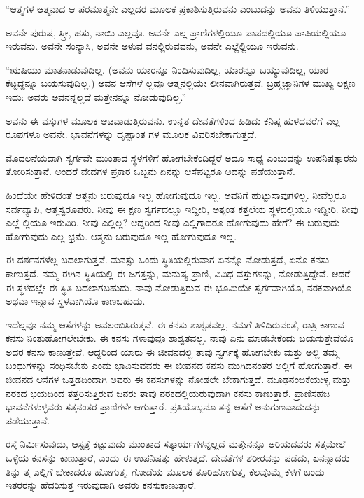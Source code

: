 “ಆತ್ಮಗಳ ಆತ್ಮನಾದ ಆ ಪರಮಾತ್ಮನೇ ಎಲ್ಲದರ ಮೂಲಕ ಪ್ರಕಾಶಿಸುತ್ತಿರುವನು ಎಂಬುದನ್ನು ಅವನು ತಿಳಿಯುತ್ತಾನೆ.”

ಅವನೇ ಪುರುಷ, ಸ್ತ್ರೀ, ಹಸು, ನಾಯಿ ಎಲ್ಲವೂ. ಅವನೇ ಎಲ್ಲ ಪ್ರಾಣಿಗಳಲ್ಲಿಯೂ ಪಾಪದಲ್ಲಿಯೂ ಪಾಪಿಯಲ್ಲಿಯೂ ಇರುವನು. ಅವನೇ ಸಂನ್ಯಾಸಿ, ಅವನೇ ಅಳುವ ವನಲ್ಲಿರುವವನು, ಅವನೇ ಎಲ್ಲೆಲ್ಲಿಯೂ ಇರುವನು.

“ಋಷಿಯು ಮಾತನಾಡುವುದಿಲ್ಲ. (ಅವನು ಯಾರನ್ನೂ ನಿಂದಿಸುವುದಿಲ್ಲ, ಯಾರನ್ನೂ ಬಯ್ಯುವುದಿಲ್ಲ, ಯಾರ ಕೆಟ್ಟದ್ದನ್ನೂ ಬಯಸುವುದಿಲ್ಲ.) ಅವನ ಆಸೆಗಳೆ ಲ್ಲವೂ ಆತ್ಮನಲ್ಲಿಯೇ ಲೀನವಾಗಿರುತ್ತವೆ. ಬ್ರಹ್ಮಜ್ಞಾನಿಗಳ ಮುಖ್ಯ ಲಕ್ಷಣ ಇದು: ಅವರು ಅವನನ್ನಲ್ಲದೆ ಮತ್ತೇನನ್ನೂ ನೋಡುವುದಿಲ್ಲ.”

ಅವನು ಈ ವಸ್ತುಗಳ ಮೂಲಕ ಆಟವಾಡುತ್ತಿರುವನು. ಉನ್ನತ ದೇವತೆಗಳಿಂದ ಹಿಡಿದು ಕನಿಷ್ಠ ಹುಳದವರೆಗೆ ಎಲ್ಲ ರೂಪಗಳೂ ಅವನೇ. ಭಾವನೆಗಳನ್ನು ದೃಷ್ಟಾಂತ ಗಳ ಮೂಲಕ ವಿವರಿಸಬೇಕಾಗುತ್ತದೆ.

ಮೊದಲನೆಯದಾಗಿ ಸ್ವರ್ಗವೇ ಮುಂತಾದ ಸ್ಥಳಗಳಿಗೆ ಹೋಗಬೇಕೆಂದಿದ್ದರೆ ಅದೂ ಸಾಧ್ಯ ಎಂಬುದನ್ನು ಉಪನಿಷತ್ಕಾರನು ತೋರಿಸುತ್ತಾನೆ. ಅಂದರೆ ವೇದಗಳ ಪ್ರಕಾರ ಒಬ್ಬನು ಏನನ್ನು ಆಸೆಪಟ್ಟರೂ ಅದನ್ನು ಪಡೆಯುತ್ತಾನೆ.

ಹಿಂದೆಯೇ ಹೇಳಿದಂತೆ ಆತ್ಮನು ಬರುವುದೂ ಇಲ್ಲ ಹೋಗುವುದೂ ಇಲ್ಲ. ಅವನಿಗೆ ಹುಟ್ಟುಸಾವುಗಳಿಲ್ಲ. ನೀವೆಲ್ಲರೂ ಸರ್ವವ್ಯಾಪಿ, ಆತ್ಮಸ್ವರೂಪರು. ನೀವು ಈ ಕ್ಷಣ ಸ್ವರ್ಗದಲ್ಲೂ ಇದ್ದೀರಿ, ಅತ್ಯಂತ ಕತ್ತಲೆಯ ಸ್ಥಳದಲ್ಲಿಯೂ ಇದ್ದೀರಿ. ನೀವು ಎಲ್ಲೆ ಲ್ಲಿಯೂ ಇರುವಿರಿ. ನೀವು ಎಲ್ಲಿಲ್ಲ? ಆದ್ದರಿಂದ ನೀವು ಎಲ್ಲಿಗಾದರೂ ಹೋಗುವುದು ಹೇಗೆ? ಈ ಬರುವುದು ಹೋಗುವುದು ಎಲ್ಲ ಭ್ರಮೆ. ಆತ್ಮನು ಬರುವುದೂ ಇಲ್ಲ ಹೋಗುವುದೂ ಇಲ್ಲ.

ಈ ದರ್ಶನಗಳೆಲ್ಲ ಬದಲಾಗುತ್ತವೆ. ಮನಸ್ಸು ಒಂದು ಸ್ಥಿತಿಯಲ್ಲಿರುವಾಗ ಏನನ್ನೊ ನೋಡುತ್ತದೆ, ಏನೊ ಕನಸು ಕಾಣುತ್ತದೆ. ನಮ್ಮ ಈಗಿನ ಸ್ಥಿತಿಯಲ್ಲಿ ಈ ಜಗತ್ತನ್ನು, ಮನುಷ್ಯ ಪ್ರಾಣಿ, ವಿವಿಧ ವಸ್ತುಗಳನ್ನು, ನೋಡುತ್ತಿದ್ದೇವೆ. ಆದರೆ ಈ ಸ್ಥಳದಲ್ಲೇ ಈ ಸ್ಥಿತಿ ಬದಲಾಗಬಹುದು. ನಾವು ನೋಡುತ್ತಿರುವ ಈ ಭೂಮಿಯೇ ಸ್ವರ್ಗವಾಗಿಯೊ, ನರಕವಾಗಿಯೊ ಅಥವಾ ಇನ್ನಾವ ಸ್ಥಳವಾಗಿಯೊ ಕಾಣಬಹುದು.

ಇದೆಲ್ಲವೂ ನಮ್ಮ ಆಸೆಗಳನ್ನು ಅವಲಂಬಿಸಿರುತ್ತವೆ. ಈ ಕನಸು ಶಾಶ್ವತವಲ್ಲ, ನಮಗೆ ತಿಳಿದಿರುವಂತೆ, ರಾತ್ರಿ ಕಾಣುವ ಕನಸು ನಿಂತುಹೋಗಲೇಬೇಕು. ಈ ಕನಸು ಗಳಾವುವೂ ಶಾಶ್ವತವಲ್ಲ. ನಾವು ಏನು ಮಾಡಬೇಕೆಂದು ಬಯಸುತ್ತೇವೆಯೊ ಅದರ ಕನಸು ಕಾಣುತ್ತೇವೆ. ಆದ್ದರಿಂದ ಯಾರು ಈ ಜೀವನದಲ್ಲಿ ತಾವು ಸ್ವರ್ಗಕ್ಕೆ ಹೋಗಬೇಕು ಮತ್ತು ಅಲ್ಲಿ ತಮ್ಮ ಬಂಧುಗಳನ್ನು ಸಂಧಿಸಬೇಕು ಎಂದು ಭಾವಿಸುವವರು ಈ ಜೀವನದ ಕನಸು ಮುಗಿದನಂತರ ಅಲ್ಲಿಗೆ ಹೋಗುತ್ತಾರೆ. ಈ ಜೀವನದ ಆಸೆಗಳ ಒತ್ತಡದಿಂದಾಗಿ ಅವರು ಈ ಕನಸುಗಳನ್ನು ನೋಡಲೇ ಬೇಕಾಗುತ್ತದೆ. ಮೂಢನಂಬಿಕೆಯುಳ್ಳ ಮತ್ತು ನರಕದ ಭಯದಿಂದ ತತ್ತರಿಸುತ್ತಿರುವ ಜನರು ತಾವು ನರಕದಲ್ಲಿಯರುವುದಾಗಿ ಕನಸು ಕಾಣುತ್ತಾರೆ. ಪ್ರಾಣಿಸಹಜ ಭಾವನೆಗಳುಳ್ಳವರು ಸತ್ತನಂತರ ಪ್ರಾಣಿಗಳೇ ಆಗುತ್ತಾರೆ. ಪ್ರತಿಯೊಬ್ಬನೂ ತನ್ನ ಆಸೆಗೆ ಅನುಗುಣವಾದುದನ್ನು ಪಡೆಯುತ್ತಾನೆ.

ರಸ್ತೆ ನಿರ್ಮಿಸುವುದು, ಆಸ್ಪತ್ರೆ ಕಟ್ಟುವುದು ಮುಂತಾದ ಸತ್ಕಾರ್ಯಗಳನ್ನಲ್ಲದೆ ಮತ್ತೇನನ್ನೂ ಅರಿಯದವರು ಸತ್ತಮೇಲೆ ಒಳ್ಳೆಯ ಕನಸನ್ನು ಕಾಣುತ್ತಾರೆ, ಎಂದು ಈ ಉಪನಿಷತ್ತು ಹೇಳುತ್ತದೆ. ದೇವತೆಗಳ ಶರೀರವನ್ನು ಪಡೆದು, ಏನನ್ನಾದರು ತಿನ್ನು ತ್ತ ಎಲ್ಲಿಗೆ ಬೇಕಾದರೂ ಹೋಗುತ್ತ, ಗೋಡೆಯ ಮೂಲಕ ತೂರಿಹೋಗುತ್ತ, ಕೆಲವೊಮ್ಮೆ ಕೆಳಗೆ ಬಂದು ಇತರರನ್ನು ಹೆದರಿಸುತ್ತ ಇರುವುದಾಗಿ ಅವರು ಕನಸುಕಾಣುತ್ತಾರೆ.


